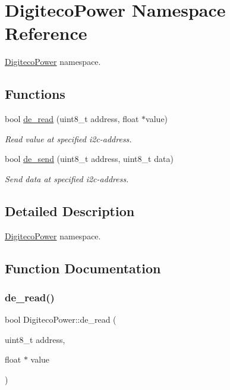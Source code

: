 \hypertarget{namespaceDigitecoPower}{}\section{Digiteco\+Power Namespace Reference}
\label{namespaceDigitecoPower}


\hyperlink{namespaceDigitecoPower}{Digiteco\+Power} namespace.  


\subsection*{Functions}
\begin{DoxyCompactItemize}
\item 
bool \hyperlink{namespaceDigitecoPower_adb7461d6d597526eace685d0365732b7}{de\+\_\+read} (uint8\+\_\+t address, float $\ast$value)
\begin{DoxyCompactList}\small\item\em Read value at specified i2c-\/address. \end{DoxyCompactList}\item 
bool \hyperlink{namespaceDigitecoPower_a2a1d64ce6df863e91fef034a496220fd}{de\+\_\+send} (uint8\+\_\+t address, uint8\+\_\+t data)
\begin{DoxyCompactList}\small\item\em Send data at specified i2c-\/address. \end{DoxyCompactList}\end{DoxyCompactItemize}


\subsection{Detailed Description}
\hyperlink{namespaceDigitecoPower}{Digiteco\+Power} namespace. 

\subsection{Function Documentation}
\mbox{\label{namespaceDigitecoPower_adb7461d6d597526eace685d0365732b7}} 
\subsubsection{\texorpdfstring{de\+\_\+read()}{de\_read()}}
{\footnotesize\ttfamily bool Digiteco\+Power\+::de\+\_\+read (\begin{DoxyParamCaption}\item[{uint8\+\_\+t}]{address,  }\item[{float $\ast$}]{value }\end{DoxyParamCaption})}



